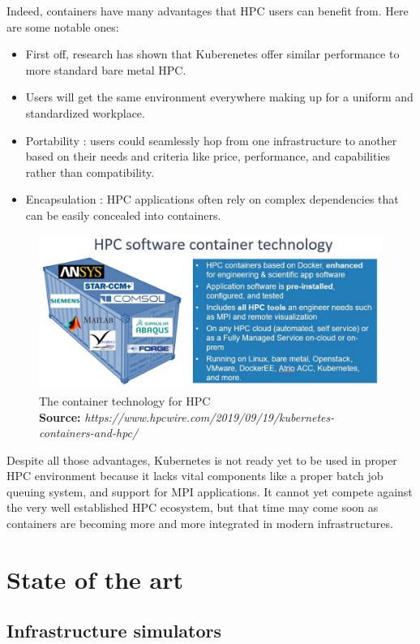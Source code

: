 \documentclass[12pt, a4paper]{memoir}
\newcommand*{\captionsource}[2]{%
    \caption[{#1}]{%
        #1%
        \\\hspace{\linewidth}%
	\textbf{Source:} \textit{#2}%
    }%
}
\begin{document}
Indeed, containers have many advantages that HPC users can benefit from. Here
are some notable ones:
\begin{itemize}
	\item First off, research has shown that Kuberenetes offer similar
		performance to more standard bare metal HPC\cite{8950981}.
	\item Users will get the same environment everywhere making up for a
		uniform and standardized workplace.
	\item Portability : users could seamlessly hop from one infrastructure
		to another based on their needs and criteria like price,
		performance, and capabilities rather than compatibility.
	\item Encapsulation : HPC applications often rely on complex
		dependencies that can be easily concealed into containers.
\end{itemize}
\begin{figure}[h]
	\centering
	\includegraphics[scale=0.5]{../imgs/hpc-container.jpg}
	\captionsource{The container technology for HPC}{https://www.hpcwire.com/2019/09/19/kubernetes-containers-and-hpc/}
	\label{fig:hpc-container}
\end{figure}

Despite all those advantages, Kubernetes is not ready yet to be used in proper
HPC environment because it lacks vital components like a proper batch job
queuing system, and support for MPI applications. It cannot yet compete against
the very well established HPC ecosystem, but that time may come soon as
containers are becoming more and more integrated in modern infrastructures.

\chapter{State of the art}
\section{Infrastructure simulators}
\end{document}
